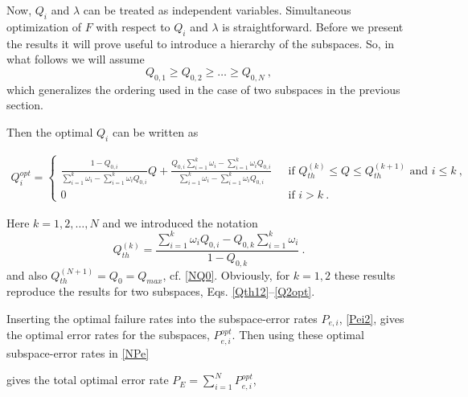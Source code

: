 \documentclass[aps,pra,twocolumn,eqsecnum,showpacs]{revtex4}
\begin{document}
Now, $Q_{i}$ and $\lambda$ can be treated as independent variables. Simultaneous optimization of $F$ with respect to $Q_{i}$ and $\lambda$ is straightforward. Before we present the results it will prove useful to introduce a hierarchy of the subspaces. So, in what follows we will assume 
\begin{equation}
Q_{0,1} \geq Q_{0,2} \geq \ldots \geq Q_{0,N} \ ,
\label{hierarchy}
\end{equation} 
which generalizes the ordering used in the case of two subspaces in the previous section. 

Then the optimal $Q_{i}$ can be written as
\begin{widetext}
\begin{eqnarray}
    \label{Qiopt}
    Q_{i}^{opt} = \left\{ \begin{array}{ll}
	\frac{1 - Q_{0,i}}{\sum_{i=1}^{k}\omega_{i} - \sum_{i=1}^{k}\omega_{i}Q_{0,i}}Q + \frac{Q_{0,i}\sum_{i=1}^{k}\omega_{i} - \sum_{i=1}^{k}\omega_iQ_{0,i}}{\sum_{i=1}^{k}\omega_{i} - \sum_{i=1}^{k}\omega_iQ_{0,i}} & \ \ \  \mbox{if $Q_{th}^{(k)} \leq Q \leq Q_{th}^{(k+1)}$ and $i \leq k$} \ , \\
0 & \ \ \  \mbox{if $i > k$} \ .
\end{array}
\right. 
\end{eqnarray}
\end{widetext}
Here $k=1,2,\ldots,N$ and we introduced the notation 
\begin{equation}
Q_{th}^{(k)} = \frac{\sum_{i=1}^{k}\omega_iQ_{0,i} - Q_{0,k}\sum_{i=1}^{k}\omega_{i}}{1 - Q_{0,k}} \ .
\end{equation}
and also $Q_{th}^{(N+1)} = Q_{0} = Q_{max}$, cf. \eqref{NQ0}. Obviously, for $k=1,2$ these results reproduce the results for two subspaces, Eqs. \eqref{Qth12}--\eqref{Q2opt}.

Inserting the optimal failure rates into the subspace-error rates $P_{e,i}$, \eqref{Pei2}, gives the optimal error rates for the subspaces, $P_{e,i}^{opt}$. Then using these optimal subspace-error rates in \eqref{NPe} 

gives the total optimal error rate $P_{E} = \sum_{i=1}^{N} P_{e,i}^{opt}$,
\end{document}
